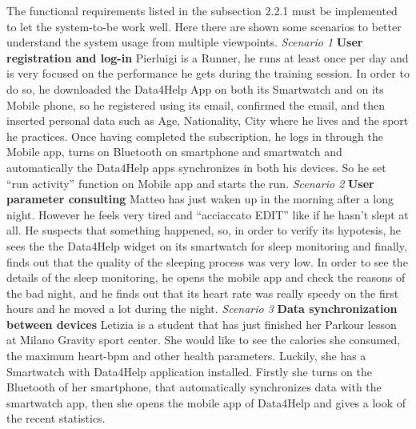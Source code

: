 The functional requirements listed in the subsection 2.2.1 must be implemented to let the system-to-be work well. \vspace{2mm}  \newline 
Here there are shown some scenarios to better understand the system usage from multiple viewpoints.\vspace{2mm}  \newline 
\noindent \emph{Scenario 1}\textbf{ User registration and log-in} \newline
Pierluigi is a Runner, he runs at least once per day and is very focused on the performance he gets during the training session.
In order to do so, he downloaded the Data4Help App on both its Smartwatch and on its Mobile phone, so he registered using its email, confirmed the email, and then inserted personal data such as Age, Nationality, City where he lives and the sport he practices.
Once having completed the subscription, he logs in through the Mobile app, turns on Bluetooth on smartphone and smartwatch and automatically the Data4Help apps synchronizes in both his devices. So he set “run activity” function on Mobile app and starts the run.
\vspace{2mm} \newline
\noindent \emph{Scenario 2}\textbf{ User parameter consulting} \newline
Matteo has just waken up in the morning after a long night. However he feels very tired and “acciaccato EDIT” like if he hasn’t slept at all. He suspects that something happened, so, in order to verify its hypotesis, he sees the the Data4Help widget on its smartwatch for sleep monitoring and finally, finds out that the quality of the sleeping process was very low.
In order to see the details of the sleep monitoring, he opens the mobile app and check the reasons of the bad night, and he finds out that its heart rate was really speedy on the first hours and he moved a lot during the night.
\vspace{2mm} \newline
\noindent \emph{Scenario 3} \textbf{Data synchronization between devices}
Letizia is a student that has just finished her Parkour lesson at Milano Gravity sport center.
She would like to see the calories she consumed, the maximum heart-bpm and other health parameters. Luckily, she has a Smartwatch with Data4Help application installed. Firstly she turns on the Bluetooth of her smartphone, that automatically synchronizes data with the smartwatch app, then she opens the mobile app of Data4Help and gives a look of the recent statistics.
